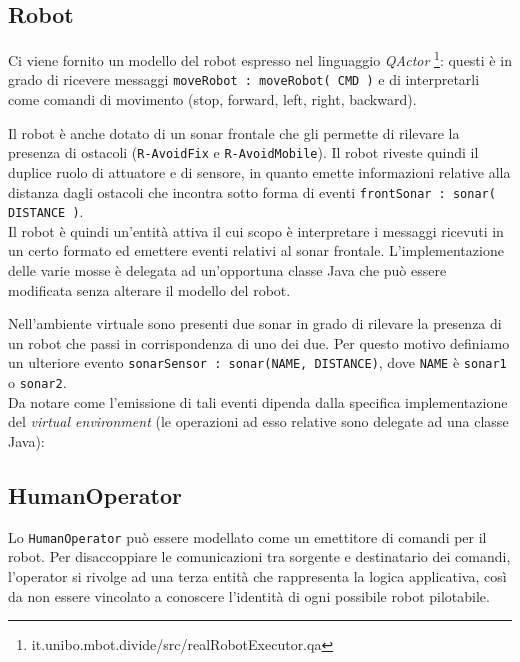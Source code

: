 \documentclass{../llncs}
\newcommand{\codescript}[1]{{\mbox{\small{\texttt{#1}}}}\xspace}
\newcommand{\code}[1]{{\color{blue}\small{\texttt{#1}}}}
\newcommand{\qa}{\textsf{\textit{QActor}}}
\begin{document}
\subsection{Robot}
Ci viene fornito un modello del robot espresso nel linguaggio \qa
\footnote{it.unibo.mbot.divide/src/realRobotExecutor.qa}: questi è in grado di ricevere messaggi \codescript{moveRobot : moveRobot( CMD )} e di interpretarli come comandi di movimento (stop, forward, left, right, backward).

Il robot è anche dotato di un sonar frontale che gli permette di rilevare la presenza di ostacoli (\code{R-AvoidFix} e \code{R-AvoidMobile}). Il robot riveste quindi il duplice ruolo di attuatore e di sensore, in quanto emette informazioni relative alla distanza dagli ostacoli che incontra sotto forma di eventi \codescript{frontSonar : sonar( DISTANCE )}.\\

Il robot è quindi un'entità attiva il cui scopo è interpretare i messaggi ricevuti in un certo formato ed emettere eventi relativi al sonar frontale. L'implementazione delle varie mosse è delegata ad un'opportuna classe Java che può essere modificata senza alterare il modello del robot.\\



\vspace{8px}

Nell'ambiente virtuale sono presenti due sonar in grado di rilevare la presenza di un robot che passi in corrispondenza di uno dei due. Per questo motivo definiamo un ulteriore evento \codescript{sonarSensor : sonar(NAME, DISTANCE)}, dove \codescript{NAME} è \code{sonar1} o \code{sonar2}.\\

Da notare come l'emissione di tali eventi dipenda dalla specifica implementazione del \textit{virtual environment} (le operazioni ad esso relative sono delegate ad una classe Java):



\subsection{HumanOperator}
Lo \texttt{HumanOperator} può essere modellato come un emettitore di comandi per il robot. Per disaccoppiare le comunicazioni tra sorgente e destinatario dei comandi, l'operator si rivolge ad una terza entità che rappresenta la logica applicativa, così da non essere vincolato a conoscere l'identità di ogni possibile robot pilotabile.\\
\end{document}
